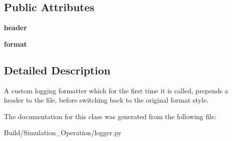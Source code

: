 \subsection*{Public Attributes}
\begin{DoxyCompactItemize}
\item 
\mbox{\label{class_build_1_1_simulation___operation_1_1logger_1_1_simulation_logger_1_1_formatter_with_header_a0f60bb435e92c198acb771511ed8eeee}} 
{\bfseries header}
\item 
\mbox{\label{class_build_1_1_simulation___operation_1_1logger_1_1_simulation_logger_1_1_formatter_with_header_a4240865ecf6ee3bad4a5e64aedcfa38b}} 
{\bfseries format}
\end{DoxyCompactItemize}


\subsection{Detailed Description}
A custom logging formatter which for the first time it is called, prepends a header to the file, before switching back to the original format style. 



The documentation for this class was generated from the following file\+:\begin{DoxyCompactItemize}
\item 
Build/\+Simulation\+\_\+\+Operation/logger.\+py\end{DoxyCompactItemize}
